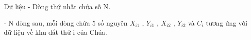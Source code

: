 Dữ liệu
- Dòng thứ nhất chứa số N.


- N dòng sau, mỗi dòng chứa 5 số nguyên $X_{i1}$ , $Y_{i1}$ , $X_{i2}$ , $Y_{i2}$ và $C_{i}$ tương ứng với dữ liệu về khu đất thứ i của Chúa.
